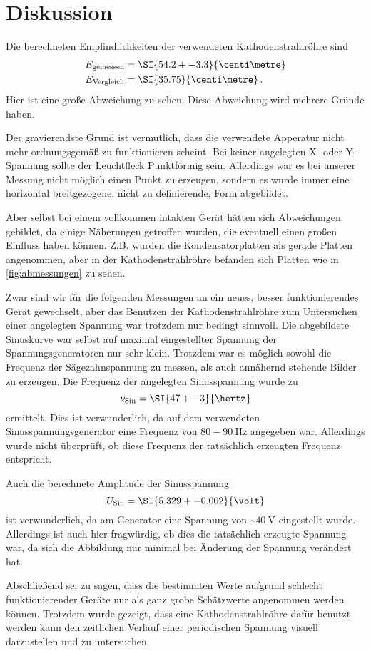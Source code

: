 \section{Diskussion}
\label{sec:Diskussion}

Die berechneten Empfindlichkeiten der verwendeten Kathodenstrahlröhre sind
\begin{align*}
    E_\text{gemessen} &= \SI{54.2+-3.3}{\centi\metre} \\
    E_\text{Vergleich} &= \SI{35.75}{\centi\metre} \, .
\end{align*}
Hier ist eine große Abweichung zu sehen.
Diese Abweichung wird mehrere Gründe haben. 

Der gravierendste Grund ist vermutlich, dass die verwendete Apperatur nicht mehr ordnungsgemäß zu funktionieren scheint.
Bei keiner angelegten X- oder Y-Spannung sollte der Leuchtfleck Punktförmig sein. Allerdings war es bei unserer Messung nicht möglich einen Punkt zu erzeugen, sondern es wurde immer eine horizontal breitgezogene, nicht zu definierende, Form abgebildet.

Aber selbst bei einem vollkommen intakten Gerät hätten sich Abweichungen gebildet, da einige Näherungen getroffen wurden, die eventuell einen großen Einfluss haben können. 
Z.B. wurden die Kondensatorplatten als gerade Platten angenommen, aber in der Kathodenstrahlröhre befanden sich Platten wie in \autoref{fig:abmessungen} zu sehen.

Zwar sind wir für die folgenden Messungen an ein neues, besser funktionierendes Gerät gewechselt,
aber das Benutzen der Kathodenstrahlröhre zum Untersuchen einer angelegten Spannung war trotzdem nur bedingt sinnvoll.
Die abgebildete Sinuskurve war selbst auf maximal eingestellter Spannung der Spannungsgeneratoren nur sehr klein.
Trotzdem war es möglich sowohl die Frequenz der Sägezahnspannung zu messen, als auch annähernd stehende Bilder zu erzeugen.
Die Frequenz der angelegten Sinusspannung wurde zu
\begin{equation*}
    \nu_\text{Sin} = \SI{47+-3}{\hertz}
\end{equation*}
ermittelt. 
Dies ist verwunderlich, da auf dem verwendeten Sinusspannungsgenerator eine Frequenz von $80-90 \: \si{\hertz}$ angegeben war.
Allerdings wurde nicht überprüft, ob diese Frequenz der tatsächlich erzeugten Frequenz entspricht.

Auch die berechnete Amplitude der Sinusspannung
\begin{equation*}
    U_\text{Sin} = \SI{5.329+-0.002}{\volt}
\end{equation*}
ist verwunderlich, da am Generator eine Spannung von \~$\SI{40}{\volt}$ eingestellt wurde.
Allerdings ist auch hier fragwürdig, ob dies die tatsächlich erzeugte Spannung war, da sich die Abbildung nur minimal bei Änderung der Spannung verändert hat.

Abschließend sei zu sagen, dass die bestimmten Werte aufgrund schlecht funktionierender Geräte nur als ganz grobe Schätzwerte angenommen werden können.
Trotzdem wurde gezeigt, dass eine Kathodenstrahlröhre dafür benutzt werden kann den zeitlichen Verlauf einer periodischen Spannung visuell darzustellen und zu untersuchen.